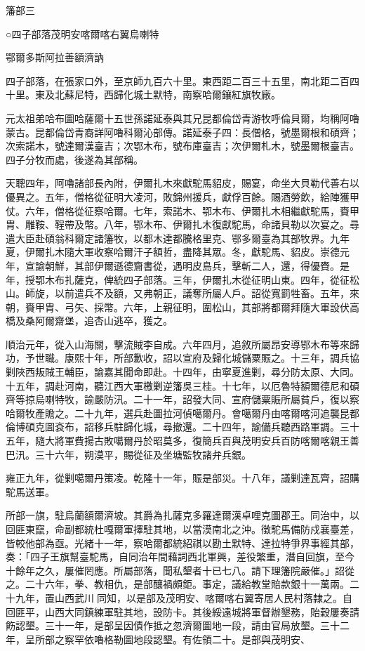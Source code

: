 
\begin{pinyinscope}
籓部三

○四子部落茂明安喀爾喀右翼烏喇特

鄂爾多斯阿拉善額濟訥

四子部落，在張家口外，至京師九百六十里。東西距二百三十五里，南北距二百四十里。東及北蘇尼特，西歸化城土默特，南察哈爾鑲紅旗牧廠。

元太祖弟哈布圖哈薩爾十五世孫諾延泰與其兄昆都倫岱青游牧呼倫貝爾，均稱阿嚕蒙古。昆都倫岱青裔詳阿嚕科爾沁部傳。諾延泰子四：長僧格，號墨爾根和碩齊；次索諾木，號達爾漢臺吉；次鄂木布，號布庫臺吉；次伊爾札木，號墨爾根臺吉。四子分牧而處，後遂為其部稱。

天聰四年，阿嚕諸部長內附，伊爾扎木來獻駝馬貂皮，賜宴，命坐大貝勒代善右以優異之。五年，僧格從征明大凌河，敗錦州援兵，獻俘百餘。賜酒勞飲，給陣獲甲仗。六年，僧格從征察哈爾。七年，索諾木、鄂木布、伊爾扎木相繼獻駝馬，賚甲胄、雕鞍、鞓帶及幣。八年，鄂木布、伊爾扎木復獻駝馬，命諸貝勒以次宴之。尋遣大臣赴碩翁科爾定諸籓牧，以都木達都騰格里克、鄂多爾臺為其部牧界。九年夏，伊爾扎木隨大軍收察哈爾汗子額哲，盡降其眾。冬，獻駝馬、貂皮。崇德元年，宣諭朝鮮，其部伊爾遜德齎書從，遇明皮島兵，擊斬二人，還，得優賚。是年，授鄂木布扎薩克，俾統四子部落。三年，伊爾扎木從征明山東。四年，從征松山。師旋，以前遣兵不及額，又弗朝正，議奪所屬人戶。詔從寬罰牲畜。五年，來朝，賚甲胄、弓矢、採幣。六年，上親征明，圍松山，其部將都爾拜隨大軍設伏高橋及桑阿爾齋堡，追杏山逃卒，獲之。

順治元年，從入山海關，擊流賊李自成。六年四月，追敘所屬昂安導鄂木布等來歸功，予世職。康熙十年，所部歉收，詔以宣府及歸化城儲粟賑之。十三年，調兵協剿陜西叛賊王輔臣，諭嘉其聞命即赴。十四年，由寧夏進剿，尋分防太原、大同。十五年，調赴河南，聽江西大軍檄剿逆籓吳三桂。十七年，以厄魯特額爾德尼和碩齊等掠烏喇特牧，諭嚴防汛。二十一年，詔發大同、宣府儲粟賑所屬貧戶，復以察哈爾牧產贍之。二十九年，選兵赴圖拉河偵噶爾丹。會噶爾丹由喀爾喀河追襲昆都倫博碩克圖袞布，詔移兵駐歸化城，尋撤還。二十四年，諭備兵聽西路軍調。三十五年，隨大將軍費揚古敗噶爾丹於昭莫多，復簡兵百與茂明安兵百防喀爾喀親王善巴汛。三十六年，朔漠平，賜從征及坐塘監牧諸弁兵銀。

雍正九年，從剿噶爾丹策凌。乾隆十一年，賑是部災。十八年，議剿達瓦齊，詔購駝馬送軍。

所部一旗，駐烏蘭額爾濟坡。其爵為扎薩克多羅達爾漢卓哩克圖郡王。同治中，以回匪東竄，命副都統杜嘎爾軍擇駐其地，以當漠南北之沖。徵駝馬備防戍襄臺差，皆較他部為亟。光緒十一年，察哈爾都統紹祺以勘土默特、達拉特爭界事經其部，奏：「四子王旗幫臺駝馬，自同治年間藉詞西北軍興，差役繁重，潛自回旗，至今十餘年之久，屢催罔應。所屬部落，聞私墾者十已七八。請下理籓院嚴催。」詔從之。二十六年，拳、教相仇，是部釀禍頗鉅。事定，議給教堂賠款銀十一萬兩。二十九年，置山西武川同知，以是部及茂明安、喀爾喀右翼寄居人民村落隸之。自回匪平，山西大同鎮練軍駐其地，設防卡。其後綏遠城將軍督辦墾務，貽穀屢奏請飭認墾。三十一年，是部呈因債作抵之忽濟爾圖地一段，請由官局放墾。三十二年，呈所部之察罕依嚕格勒圖地段認墾。有佐領二十。是部與茂明安、


\end{pinyinscope}
